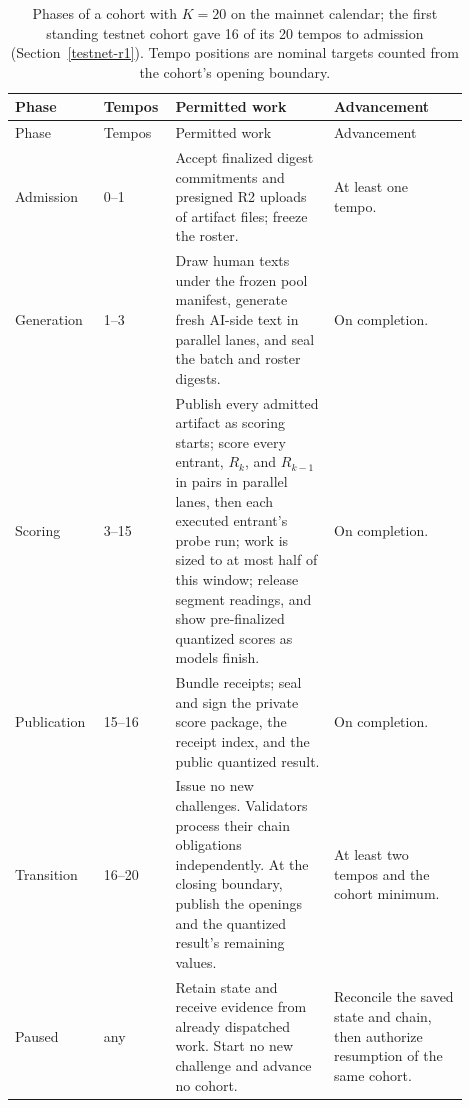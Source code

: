 \begin{longtable}{p{0.17\linewidth}p{0.12\linewidth}p{0.33\linewidth}p{0.28\linewidth}}
\caption{Phases of a cohort with \(K=20\) on the mainnet calendar; the first
standing testnet cohort gave 16 of its 20 tempos to admission
(Section~\ref{testnet-r1}). Tempo positions are nominal targets counted from
the cohort's opening boundary.}\label{tab:cohort-phases}\\
\toprule
Phase & Tempos & Permitted work & Advancement \\
\midrule
\endfirsthead
\toprule
Phase & Tempos & Permitted work & Advancement \\
\midrule
\endhead
Admission & 0--1 & Accept finalized digest commitments and presigned R2
uploads of artifact files; freeze the roster. & At least one tempo. \\
Generation & 1--3 & Draw human texts under the frozen pool manifest, generate
fresh AI-side text in parallel lanes, and seal the batch and roster digests. &
On completion. \\
Scoring & 3--15 & Publish every admitted artifact as scoring starts; score
every entrant, \(R_k\), and \(R_{k-1}\) in pairs in parallel lanes, then each
executed entrant's probe run; work is sized to at most half of this window;
release segment readings, and show pre-finalized quantized scores as models
finish. & On completion. \\
Publication & 15--16 & Bundle receipts; seal and sign the private score
package, the receipt index, and the public quantized result. & On completion. \\
Transition & 16--20 & Issue no new challenges. Validators process their chain
obligations independently. At the closing boundary, publish the openings and
the quantized result's remaining values. & At least two tempos and the cohort minimum. \\
Paused & any & Retain state and receive evidence from already dispatched work.
Start no new challenge and advance no cohort. & Reconcile the saved state and
chain, then authorize resumption of the same cohort. \\
\bottomrule
\end{longtable}

